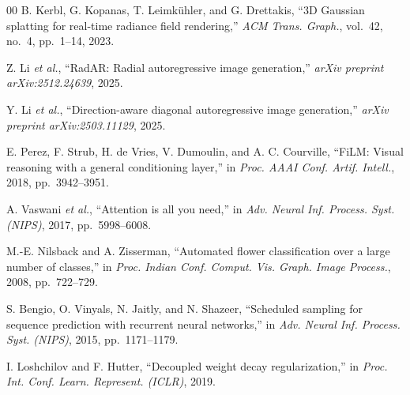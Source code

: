 \documentclass[conference,a4paper]{IEEEtran}
\begin{document}
\begin{thebibliography}{00}
B. Kerbl, G. Kopanas, T. Leimk{\"u}hler, and G. Drettakis,
``3D Gaussian splatting for real-time radiance field rendering,''
\textit{ACM Trans. Graph.}, vol.~42, no.~4, pp.~1--14, 2023.

Z. Li \textit{et al.},
``RadAR: Radial autoregressive image generation,''
\textit{arXiv preprint arXiv:2512.24639}, 2025.

Y. Li \textit{et al.},
``Direction-aware diagonal autoregressive image generation,''
\textit{arXiv preprint arXiv:2503.11129}, 2025.

E. Perez, F. Strub, H. de Vries, V. Dumoulin, and A. C. Courville,
``FiLM: Visual reasoning with a general conditioning layer,''
in \textit{Proc. AAAI Conf. Artif. Intell.}, 2018, pp.~3942--3951.

A. Vaswani \textit{et al.},
``Attention is all you need,''
in \textit{Adv. Neural Inf. Process. Syst. (NIPS)}, 2017, pp.~5998--6008.

M.-E. Nilsback and A. Zisserman,
``Automated flower classification over a large number of classes,''
in \textit{Proc. Indian Conf. Comput. Vis. Graph. Image Process.}, 2008,
pp.~722--729.

S. Bengio, O. Vinyals, N. Jaitly, and N. Shazeer,
``Scheduled sampling for sequence prediction with recurrent neural
networks,''
in \textit{Adv. Neural Inf. Process. Syst. (NIPS)}, 2015, pp.~1171--1179.

I. Loshchilov and F. Hutter,
``Decoupled weight decay regularization,''
in \textit{Proc. Int. Conf. Learn. Represent. (ICLR)}, 2019.

\end{thebibliography}
\end{document}

